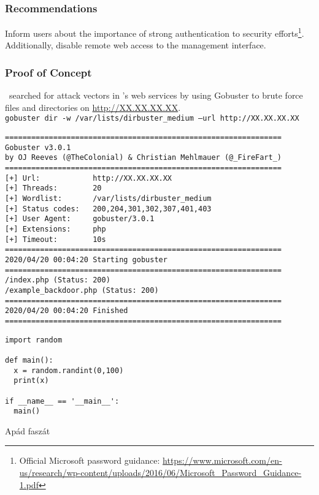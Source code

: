 \subsubsection{Recommendations}
Inform users about the importance of strong authentication to security efforts\footnote{Official Microsoft password guidance: \url{https://www.microsoft.com/en-us/research/wp-content/uploads/2016/06/Microsoft_Password_Guidance-1.pdf}}. Additionally, disable remote web access to the management interface.


\subsubsection{Proof of Concept}

\osid\ searched for attack vectors in \fullhostname's web services by using Gobuster to brute force files and directories on \url{http://XX.XX.XX.XX}.\\
\texttt{gobuster dir -w /var/lists/dirbuster_medium --url http://XX.XX.XX.XX}
\begin{lstlisting}
===============================================================
Gobuster v3.0.1
by OJ Reeves (@TheColonial) & Christian Mehlmauer (@_FireFart_)
===============================================================
[+] Url:            http://XX.XX.XX.XX
[+] Threads:        20
[+] Wordlist:       /var/lists/dirbuster_medium
[+] Status codes:   200,204,301,302,307,401,403
[+] User Agent:     gobuster/3.0.1
[+] Extensions:     php
[+] Timeout:        10s
===============================================================
2020/04/20 00:04:20 Starting gobuster
===============================================================
/index.php (Status: 200)
/example_backdoor.php (Status: 200)
===============================================================
2020/04/20 00:04:20 Finished
===============================================================	
\end{lstlisting}

\begin{listing}[!ht]
\centering
\begin{verbatim}
import random

def main():
  x = random.randint(0,100)
  print(x)

if __name__ == '__main__':
  main()

\end{verbatim}
\caption{Apád faszát}
\label{lst:fasz}
\end{listing}




